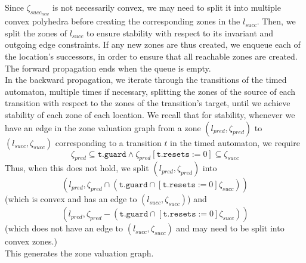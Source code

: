 \documentclass[a4paper]{llncs}
\begin{document}
Since $\zeta _{succ_{new}}$ is not necessarily convex, we may need to
split it into multiple convex polyhedra before creating the
corresponding zones in the $l_{succ}$. Then, we split the zones of
$l_{succ}$ to ensure stability with respect to
its invariant and outgoing edge constraints. If any new
zones are thus created, we enqueue each of the location's successors,
in order to ensure that all reachable zones are created. The forward
propagation ends when the queue is empty. \\

In the backward propagation, we
iterate through the transitions of the timed automaton, multiple times
if necessary, splitting the zones of the source of each transition
with respect to the zones of the transition's target, until we achieve
stability of each zone of each location. We recall that for stability,
whenever we have an edge in the zone valuation graph from a zone
$(l_{pred}, \zeta _{pred})$ to $(l_{succ}, \zeta _{succ})$
corresponding to a transition $t$ in the timed automaton, we require 
\begin{displaymath} 
  \zeta _{pred} \subseteq \texttt{t.guard}
  \wedge
  \zeta _{pred} [\texttt{t.resets} := 0] \subseteq \zeta _{succ}
\end{displaymath} 
Thus, when this does not hold, we split $(l_{pred}, \zeta _{pred})$
into
\begin{displaymath} 
  (l_{pred}, \zeta _{pred} \cap (\texttt{t.guard} \cap [\texttt{t.resets} := 0] \zeta _{succ}))
\end{displaymath} 
(which is convex and has an edge to $(l_{succ}, \zeta _{succ})$)
and
\begin{displaymath} 
  (l_{pred}, \zeta _{pred} - (\texttt{t.guard} \cap [\texttt{t.resets} := 0] \zeta _{succ}))
\end{displaymath} 
(which does not have an edge to $(l_{succ}, \zeta _{succ})$ and may
need to be split into convex zones.) \\
This generates the zone valuation graph.
\end{document}
